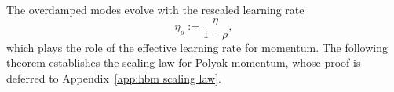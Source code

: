 \documentclass[11pt]{article}
\begin{document}













The overdamped modes evolve with the rescaled learning rate
\[
\eta_\rho:=\frac{\eta}{1-\rho},
\]
which plays the role of the effective learning rate for momentum. The following theorem establishes the  scaling law for Polyak momentum, whose proof is deferred to Appendix~\ref{app:hbm scaling law}.
\end{document}
